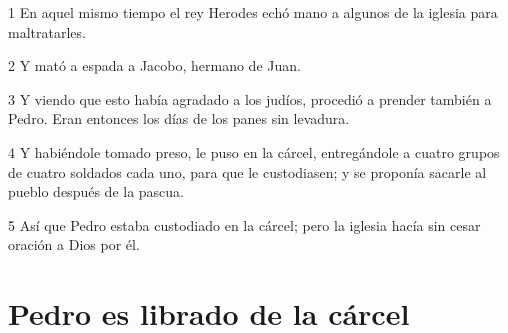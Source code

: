 \par 1 En aquel mismo tiempo el rey Herodes echó mano a algunos de la iglesia para maltratarles.
\par 2 Y mató a espada a Jacobo, hermano de Juan.
\par 3 Y viendo que esto había agradado a los judíos, procedió a prender también a Pedro. Eran entonces los días de los panes sin levadura.
\par 4 Y habiéndole tomado preso, le puso en la cárcel, entregándole a cuatro grupos de cuatro soldados cada uno, para que le custodiasen; y se proponía sacarle al pueblo después de la pascua.
\par 5 Así que Pedro estaba custodiado en la cárcel; pero la iglesia hacía sin cesar oración a Dios por él.

\section*{Pedro es librado de la cárcel}

